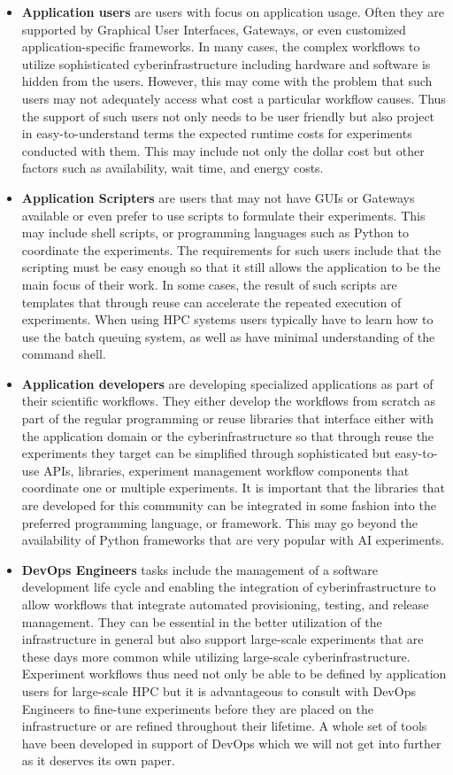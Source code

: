 \documentclass[utf8]{FrontiersinVancouver} %
\begin{document}
\begin{itemize}
    \item {\bf Application users} are users with focus on application usage. Often they are supported by Graphical User Interfaces, Gateways, or even customized application-specific frameworks. In many cases, the complex workflows to utilize sophisticated cyberinfrastructure including hardware and software is hidden from the users. However, this may come with the problem that such users may not adequately access what cost a particular workflow causes. Thus the support of such users not only needs to be user friendly but also project in easy-to-understand terms the expected runtime costs for experiments conducted with them. This may include not only the dollar cost but other factors such as availability, wait time, and energy costs.
    \item {\bf Application Scripters} are users that may not have GUIs or Gateways available or even prefer to use scripts to formulate their experiments. This may include shell scripts, or programming languages such as Python to coordinate the experiments. The requirements for such users include that the scripting must be easy enough so that it still allows the application to be the main focus of their work. In some cases, the result of such scripts are templates that through reuse can accelerate the repeated execution of experiments. When using HPC systems users typically have to learn how to use the batch queuing system, as well as have minimal understanding of the command shell. 
    \item {\bf Application developers} are developing specialized applications as part of their scientific workflows. They either develop the workflows from scratch as part of the regular programming or reuse libraries that interface either with the application domain or the cyberinfrastructure so that through reuse the experiments they target can be simplified through sophisticated but easy-to-use APIs, libraries, experiment management workflow components that coordinate one or multiple experiments. It is important that the libraries that are developed for this community can be integrated in some fashion into the preferred programming language, or framework. This may go beyond the availability of Python frameworks that are very popular with AI experiments. 
    \item {\bf DevOps Engineers} tasks include the management of a software development life cycle and enabling the integration of cyberinfrastructure to allow workflows that integrate automated provisioning, testing, and release management. They can be essential in the better utilization of the infrastructure in general but also support large-scale experiments that are these days more common while utilizing large-scale cyberinfrastructure. Experiment workflows thus need not only be able to be defined by application users for large-scale HPC but it is advantageous to consult with DevOps Engineers to fine-tune experiments before they are placed on the infrastructure or are refined throughout their lifetime. A whole set of tools have been developed in support of DevOps which we will not get into further as it deserves its own paper.

\end{itemize}
\end{document}
